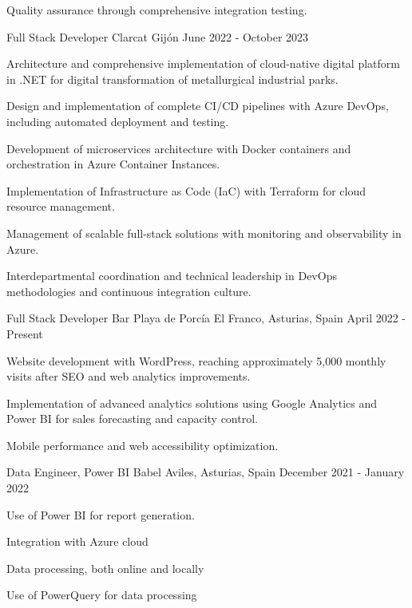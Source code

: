 \begin{cventries}
{\begin{cvitems}
            \item {Quality assurance through comprehensive integration testing.}
        \end{cvitems}
    }
    \cventry
    {Full Stack Developer} %
    {Clarcat} %
    {Gijón} %
    {June 2022 - October 2023} %
    {
        \begin{cvitems}
            \item {Architecture and comprehensive implementation of cloud-native digital platform in .NET for digital transformation of metallurgical industrial parks.}
            \item {Design and implementation of complete CI/CD pipelines with Azure DevOps, including automated deployment and testing.}
            \item {Development of microservices architecture with Docker containers and orchestration in Azure Container Instances.}
            \item {Implementation of Infrastructure as Code (IaC) with Terraform for cloud resource management.}
            \item {Management of scalable full-stack solutions with monitoring and observability in Azure.}
            \item {Interdepartmental coordination and technical leadership in DevOps methodologies and continuous integration culture.}
        \end{cvitems}
    }
    \cventry
    {Full Stack Developer} %
    {Bar Playa de Porcía} %
    {El Franco, Asturias, Spain} %
    {April 2022 - Present} %
    {
        \begin{cvitems}
            \item {Website development with WordPress, reaching approximately 5,000 monthly visits after SEO and web analytics improvements.}
            \item {Implementation of advanced analytics solutions using Google Analytics and Power BI for sales forecasting and capacity control.}
            \item {Mobile performance and web accessibility optimization.}
        \end{cvitems}
    }

\cventry
{Data Engineer, Power BI} %
{Babel} %
{Aviles, Asturias, Spain} %
{December 2021 - January 2022} %
{
    \begin{cvitems} %
        \item {Use of Power BI for report generation.}
        \item  {Integration with Azure cloud}
        \item {Data processing, both online and locally}
        \item {Use of PowerQuery for data processing}
    \end{cvitems}
}


\end{cventries}
